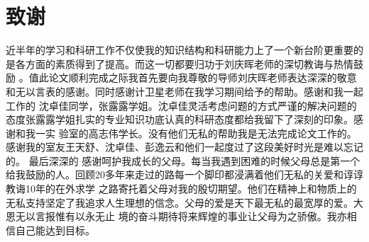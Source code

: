 
\chapter*{致谢}

近半年的学习和科研工作不仅使我的知识结构和科研能力上了一个新台阶更重要的是各方面的素质得到了提高。而这一切都要归功于刘庆晖老师的深切教诲与热情鼓励
。值此论文顺利完成之际我首先要向我尊敬的导师刘庆晖老师表达深深的敬意和无以言表的感谢。同时感谢计卫星老师在我学习期间给予的帮助。感谢和我一起工作的
沈卓佳同学，张露露学姐。沈卓佳灵活考虑问题的方式严谨的解决问题的态度张露露学姐扎实的专业知识功底认真的科研态度都给我留下了深刻的印象。感谢和我一实
验室的高志伟学长。没有他们无私的帮助我是无法完成论文工作的。感谢我的室友王天舒、沈卓佳、彭逸云和他们一起度过了这段美好时光是难以忘记的。 最后深深的
感谢呵护我成长的父母。每当我遇到困难的时候父母总是第一个给我鼓励的人。回顾20多年来走过的路每一个脚印都浸满着他们无私的关爱和谆谆教诲10年的在外求学
之路寄托着父母对我的殷切期望。他们在精神上和物质上的无私支持坚定了我追求人生理想的信念。父母的爱是天下最无私的最宽厚的爱。大恩无以言报惟有以永无止
境的奋斗期待将来辉煌的事业让父母为之骄傲。我亦相信自己能达到目标。











